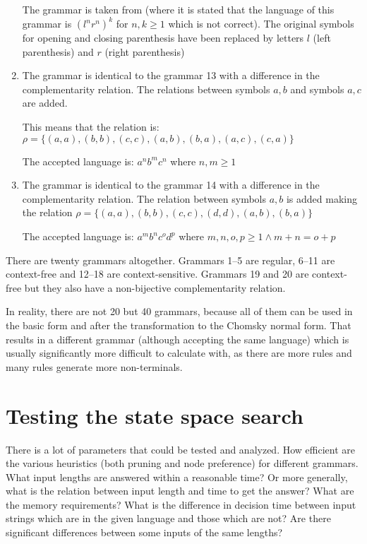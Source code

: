 \begin{enumerate}
{    The grammar is taken from \cite{WK_GRAMMARS_1} (where it is stated that the language of this grammar is $(l^nr^n)^k$ for $n, k \geq 1$ which is not correct). The original symbols for opening and closing parenthesis have been replaced by letters $l$ (left parenthesis) and $r$ (right parenthesis)
  }

  \item{
    The grammar is identical to the grammar 13 with a difference in the complementarity relation. The relations between symbols $a, b$ and symbols $a, c$ are added.

    This means that the relation is: $\rho = \{(a, a), (b, b), (c, c), (a, b), (b, a), (a, c), (c, a)\}$

    The accepted language is: $a^n b^m c^n$ where $n, m \geq 1$
  }

  \item{
	The grammar is identical to the grammar 14 with a difference in the complementarity relation. The relation between symbols $a, b$ is added making the relation $\rho = \{(a, a), (b, b), (c, c), (d, d), (a, b), (b, a)\}$

	The accepted language is: $a^m b^n c^o d^p$ where $m, n, o, p \geq 1 \wedge m+n = o+p$
  }


\end{enumerate}

There are twenty grammars altogether. Grammars 1--5 are regular, 6--11 are context-free and 12--18 are context-sensitive. Grammars 19 and 20 are context-free but they also have a non-bijective complementarity relation.

In reality, there are not 20 but 40 grammars, because all of them can be used in the basic form and after the transformation to the Chomsky normal form. That results in a different grammar (although accepting the same language) which is usually significantly more difficult to calculate with, as there are more rules and many rules generate more non-terminals.

\section{Testing the state space search}

There is a lot of parameters that could be tested and analyzed. How efficient are the various heuristics (both pruning and node preference) for different grammars. What input lengths are answered within a reasonable time? Or more generally, what is the relation between input length and time to get the answer? What are the memory requirements? What is the difference in decision time between input strings which are in the given language and those which are not? Are there significant differences between some inputs of the same lengths?

